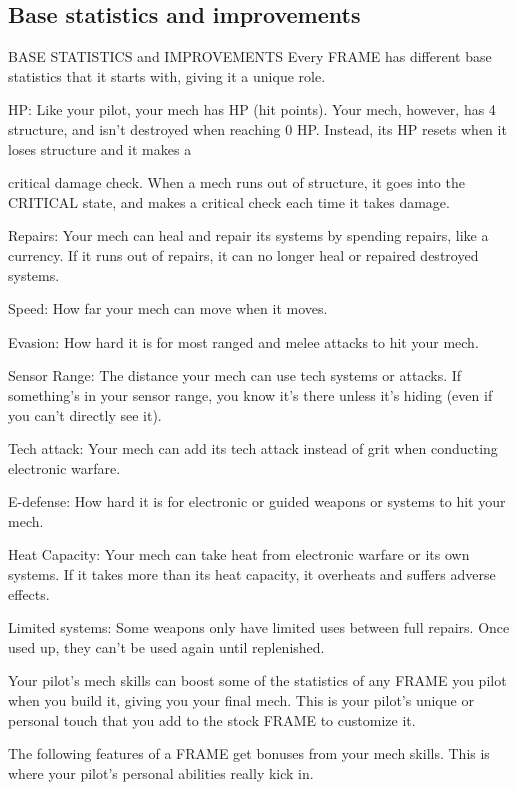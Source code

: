 \subsection{Base statistics and improvements}
                         BASE STATISTICS and IMPROVEMENTS  
Every FRAME has different base statistics that it starts with, giving it a unique role.
 

HP: Like your pilot, your mech has HP (hit points). Your mech, however, has 4 structure, and  
isn’t destroyed when reaching 0 HP. Instead, its HP resets when it loses structure and it makes a  

                                                                                                             


critical damage check. When a mech runs out of structure, it goes into the CRITICAL state, and  
makes a critical check each time it takes damage.
 
Repairs: Your mech can heal and repair its systems by spending repairs, like a currency. If it runs  
out of repairs, it can no longer heal or repaired destroyed systems.
 
Speed: How far your mech can move when it moves.
 
Evasion: How hard it is for most ranged and melee attacks to hit your mech.
 
Sensor Range: The distance your mech can use tech systems or attacks. If something’s in your  
sensor range, you know it’s there unless it’s hiding (even if you can’t directly see it).
 
Tech attack: Your mech can add its tech attack instead of grit when conducting electronic  
warfare.
 
E-defense: How hard it is for electronic or guided weapons or systems to hit your mech.
 
Heat Capacity: Your mech can take heat from electronic warfare or its own systems. If it takes  
more than its heat capacity, it overheats and suffers adverse effects.
 
Limited systems: Some weapons only have limited uses between full repairs. Once used up,  
they can’t be used again until replenished.
 

Your pilot’s mech skills can boost some of the statistics of any FRAME you pilot when you build  
it, giving you your final mech. This is your pilot’s unique or personal touch that you add to the  
stock FRAME to customize it.
 

The following features of a FRAME get bonuses from your mech skills. This is where your pilot’s  
personal abilities really kick in.
 

